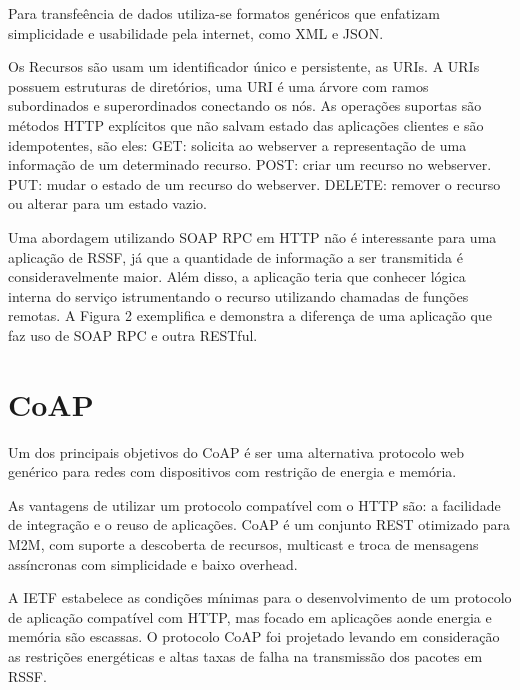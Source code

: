 Para transfe\^encia de dados utiliza-se formatos gen\'ericos que enfatizam simplicidade e usabilidade pela internet, como XML e JSON.

Os Recursos s\~ao usam um identificador \'unico e persistente, as URIs. A URIs possuem estruturas de diret\'orios, uma URI \'e uma \'arvore com ramos subordinados e superordinados conectando os n\'os. As opera\c{c}\~oes suportas s\~ao m\'etodos HTTP expl\'icitos que n\~ao salvam estado das aplica\c{c}\~oes clientes e s\~ao idempotentes, s\~ao eles:
GET: solicita ao webserver a representa\c{c}\~ao de uma informa\c{c}\~ao de um determinado recurso.
POST: criar um recurso no webserver.
PUT: mudar o estado de um recurso do webserver.
DELETE: remover o recurso ou alterar para um estado vazio.

Uma abordagem utilizando SOAP RPC em HTTP n\~ao \'e interessante para uma aplica\c{c}\~ao de RSSF, j\'a que a quantidade de informa\c{c}\~ao a ser transmitida \'e consideravelmente maior. Al\'em disso, a aplica\c{c}\~ao teria que conhecer l\'ogica interna do servi\c{c}o istrumentando o recurso utilizando chamadas de fun\c{c}\~oes remotas. A Figura 2 exemplifica e demonstra a diferen\c{c}a de uma aplica\c{c}\~ao que faz uso de SOAP RPC e outra RESTful.\cite{richardson2008restful}


\section{CoAP}

Um dos principais objetivos do CoAP \'e ser uma alternativa protocolo web gen\'erico para redes com dispositivos com restri\c{c}\~ao de energia e mem\'oria.

As vantagens de utilizar um protocolo compat\'ivel com o HTTP s\~ao: a facilidade de integra\c{c}\~ao e o reuso de aplica\c{c}\~oes. CoAP \'e um conjunto REST otimizado para M2M, com suporte a descoberta de recursos, multicast e troca de mensagens ass\'incronas com simplicidade e baixo overhead.

A IETF estabelece as condi\c{c}\~oes m\'inimas para o desenvolvimento de um protocolo de aplica\c{c}\~ao compat\'ivel com HTTP, mas focado em aplica\c{c}\~oes aonde energia e mem\'oria s\~ao escassas. O protocolo CoAP foi projetado levando em considera\c{c}\~ao as restri\c{c}\~oes energ\'eticas e altas taxas de falha na transmiss\~ao dos pacotes em RSSF.

